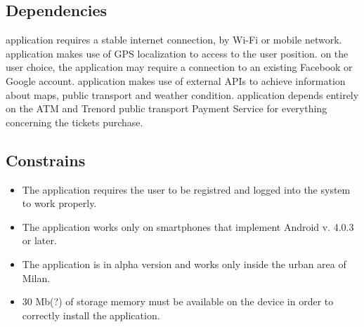 \subsection{Dependencies}
\begin{itemize}
	\The application requires a stable internet connection, by Wi-Fi or mobile network.
	\The application makes use of GPS localization to access to the user position.
	\Based on the user choice, the application may require a connection to an existing Facebook or Google account.
	\The application makes use of external APIs to achieve information about maps, public transport and weather condition.
	\The application depends entirely on the ATM and Trenord public transport Payment Service for everything concerning the tickets purchase.
\end{itemize}
\subsection{Constrains}
\begin{itemize}
	\item The application requires the user to be registred and logged into the system to work properly.
	\item The application works only on smartphones that implement Android v. 4.0.3 or later.
	\item The application is in alpha version and works only inside the urban area of Milan.
	\item 30 Mb(?) of storage memory must be available on the device in order to correctly install the application.
\end{itemize}


